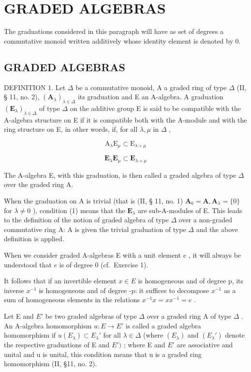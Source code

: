 \section{GRADED ALGEBRAS}

The graduations considered in this paragraph will have as set of degrees a commutative monoid written additively whose identity element is denoted by 0.

\subsection{GRADED ALGEBRAS}

DEFINITION 1. Let \(\Delta\) be a commutative monoid, A a graded ring of type \(\Delta\) (II, § 11, no. 2), \((\mathbf{A}_{\lambda})_{\lambda \in \Delta}\) its graduation and E an A-algebra. A graduation \((\mathbf{E}_{\lambda})_{\lambda \in \Delta}\) of type \(\Delta\) on the additive group E is said to be compatible with the A-algebra structure on E if it is compatible both with the A-module and with the ring structure on E, in other words, if, for all \(\lambda, \mu\) in \(\Delta\) ,

\[
\mathrm{A} _ {\lambda} \mathrm{E} _ {\mu} \subset \mathrm{E} _ {\lambda + \mu}\tag{1}
\]

\[
\mathbf {E} _ {\lambda} \mathbf {E} _ {\mu} \subset \mathbf {E} _ {\lambda + \mu}\tag{2}
\]

The A-algebra E, with this graduation, is then called a graded algebra of type \(\Delta\) over the graded ring A.

When the graduation on A is trivial (that is (II, § 11, no. 1) \(\mathbf{A}_0 = \mathbf{A}, \mathbf{A}_{\lambda} = \{0\}\) for \(\lambda \neq 0\) ), condition (1) means that the \(\mathbf{E}_{\lambda}\) are sub-A-modules of E. This leads to the definition of the notion of graded algebra of type \(\Delta\) over a non-graded commutative ring A: A is given the trivial graduation of type \(\Delta\) and the above definition is applied.

When we consider graded A-algebras E with a unit element \(e\) , it will always be understood that \(e\) is of degree 0 (cf.~Exercise 1).

It follows that if an invertible element \(x \in E\) is homogeneous and of degree p, its inverse \(x^{-1}\) is homogeneous and of degree -p: it suffices to decompose \(x^{-1}\) as a sum of homogeneous elements in the relations \(x^{-1}x = xx^{-1} = e\) .

Let E and \(E'\) be two graded algebras of type \(\Delta\) over a graded ring A of type \(\Delta\) . An A-algebra homomorphism \(u: E \to E'\) is called a graded algebra homomorphism if \(u(E_{\lambda}) \subset E_{\lambda}'\) for all \(\lambda \in \Delta\) (where \((E_{\lambda})\) and \((E_{\lambda}')\) denote the respective graduations of E and \(E')\) ; where E and \(E'\) are associative and unital and u is unital, this condition means that u is a graded ring homomorphism (II, §11, no. 2).

